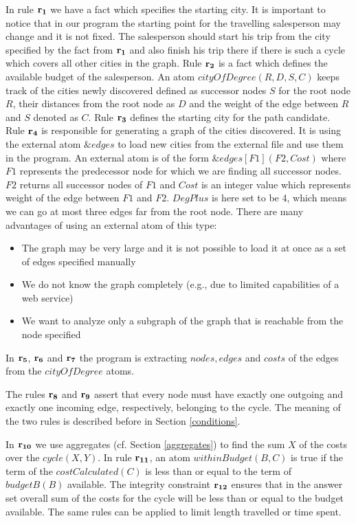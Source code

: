 \documentclass[a4paper, titlepage]{article}
\newcommand{\ext}[3]{\ensuremath{\&{\mathit{#1}}[#2](#3)}}
\newcommand{\row}[1]{%
  \ensuremath{\color{black}\ensuremath{\mathbf{#1}} \color{black}}%
}
\begin{document}
In rule $\row{r_1}$ we have a fact which specifies the starting 
city. 
It is important to notice that in our program the starting 
point for the travelling salesperson may change and it is not 
fixed. The salesperson should start his trip from the 
city specified by the fact from $\row{r_1}$ and also finish 
his trip there if there is such a cycle which covers all 
other cities in the graph. Rule $\row{r_2}$ is a fact which defines the 
available budget of the salesperson. An atom $\mathit{cityOfDegree(R,D,S,C)}$ keeps 
track of the cities newly discovered defined as successor 
nodes $S$ for the root node $R$, their distances from the 
root node as $D$ and the weight of the edge between $R$ and $S$ 
denoted as $C$. Rule $\row{r_3}$ defines the starting city for 
the path candidate. Rule $\row{r_4}$ is responsible for 
generating a graph of 
the cities discovered. It is using the external atom 
$\mathit{\&edges}$ to load new cities from the external 
file and use them in the program. An external atom is of 
the form $\ext{edges}{F1}{F2,Cost}$ where $\mathit{F1}$ 
represents the predecessor node for which we are finding 
all successor 
nodes. $\mathit{F2}$ returns all successor nodes of 
$\mathit{F1}$ and $\mathit{Cost}$ is an integer value which 
represents weight of the edge between $\mathit{F1}$ and 
$\mathit{F2}$. $\mathit{DegPlus}$ is here set to be 4, which means we can go at most three edges far from the root node. 
There are many advantages of using an external atom of this
type:
\begin{itemize}
\item The graph may be very large and it is not possible to load it 
at once as a set of edges specified manually
\item We do not know the graph completely (e.g., due to limited capabilities of a web service)
\item We want to analyze only a subgraph of the graph that is 
reachable from the node specified
\end{itemize}    
In $\row{r_5}$, $\row{r_6}$ and $\row{r_7}$ the program is extracting 
$\mathit{nodes}, \mathit{edges}$ and $\mathit{costs}$ of 
the edges from the $\mathit{cityOfDegree}$ atoms. 

The rules $\row{r_8}$ and $\row{r_9}$ assert that every 
node must have exactly one outgoing and exactly one 
incoming edge, respectively, belonging to the cycle. The meaning of the two rules is described before in Section 
\ref{conditions}.

In $\row{r_{10}}$ we use aggregates (cf. Section 
\ref{aggregates}) to find the sum $X$ of the costs over the 
$\mathit{cycle(X,Y)}$. In rule $\row{r_{11}}$, an atom 
$\mathit{withinBudget(B,C)}$ is true if the term of the 
$\mathit{costCalculated(C)}$ is less than or equal to the 
term of $\mathit{budgetB(B)}$ available. The integrity 
constraint $\row{r_{12}}$ ensures that in the answer 
set overall sum of the costs for the cycle will be less 
than or equal to the budget available. The same rules can be applied to limit length travelled or time spent.
\end{document}
